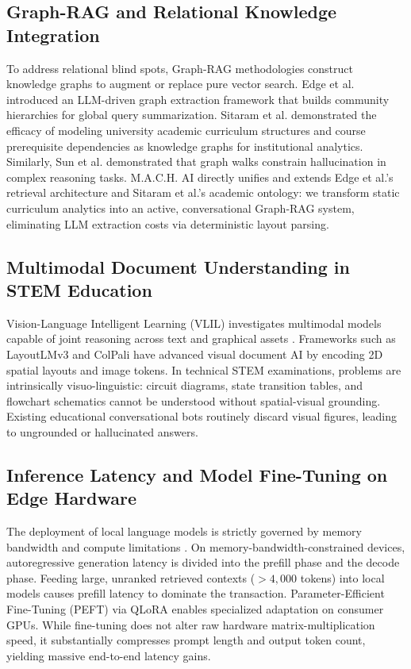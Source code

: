 \documentclass[conference]{IEEEtran}
\begin{document}
\subsection{Graph-RAG and Relational Knowledge Integration}
To address relational blind spots, Graph-RAG methodologies construct knowledge graphs to augment or replace pure vector search. Edge et al. \cite{edge2024graphrag} introduced an LLM-driven graph extraction framework that builds community hierarchies for global query summarization. Sitaram et al. \cite{sitaram2022curriculum} demonstrated the efficacy of modeling university academic curriculum structures and course prerequisite dependencies as knowledge graphs for institutional analytics. Similarly, Sun et al. \cite{sun2024think} demonstrated that graph walks constrain hallucination in complex reasoning tasks. M.A.C.H. AI directly unifies and extends Edge et al.'s retrieval architecture and Sitaram et al.'s academic ontology: we transform static curriculum analytics into an active, conversational Graph-RAG system, eliminating LLM extraction costs via deterministic layout parsing.

\subsection{Multimodal Document Understanding in STEM Education}
Vision-Language Intelligent Learning (VLIL) investigates multimodal models capable of joint reasoning across text and graphical assets \cite{marino2019okvqa}. Frameworks such as LayoutLMv3 \cite{huang2022layoutlmv3} and ColPali \cite{faysse2024colpali} have advanced visual document AI by encoding 2D spatial layouts and image tokens. In technical STEM examinations, problems are intrinsically visuo-linguistic: circuit diagrams, state transition tables, and flowchart schematics cannot be understood without spatial-visual grounding. Existing educational conversational bots routinely discard visual figures, leading to ungrounded or hallucinated answers.

\subsection{Inference Latency and Model Fine-Tuning on Edge Hardware}
The deployment of local language models is strictly governed by memory bandwidth and compute limitations \cite{frantar2023optq}. On memory-bandwidth-constrained devices, autoregressive generation latency is divided into the prefill phase and the decode phase. Feeding large, unranked retrieved contexts ($>4,000$ tokens) into local models causes prefill latency to dominate the transaction. Parameter-Efficient Fine-Tuning (PEFT) via QLoRA \cite{dettmers2023qlora} enables specialized adaptation on consumer GPUs. While fine-tuning does not alter raw hardware matrix-multiplication speed, it substantially compresses prompt length and output token count, yielding massive end-to-end latency gains.
\end{document}
